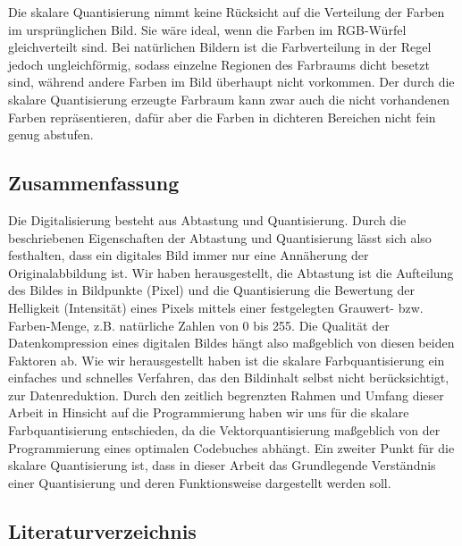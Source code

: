 Die skalare Quantisierung nimmt keine Rücksicht auf die Verteilung der Farben im ursprünglichen Bild. Sie wäre ideal, wenn die Farben im RGB-Würfel gleichverteilt sind. Bei natürlichen Bildern ist die Farbverteilung in der Regel jedoch ungleichförmig, sodass einzelne Regionen des Farbraums dicht besetzt sind, während andere Farben im Bild überhaupt nicht vorkommen. Der durch die skalare Quantisierung erzeugte Farbraum kann zwar auch die nicht vorhandenen Farben repräsentieren, dafür aber die Farben in dichteren Bereichen nicht fein genug abstufen. 
	

\subsection{\textbf{Zusammenfassung}}
Die Digitalisierung besteht aus Abtastung und Quantisierung. Durch die beschriebenen Eigenschaften der Abtastung und Quantisierung lässt sich also festhalten, dass ein digitales Bild immer nur eine Annäherung der Originalabbildung ist. Wir haben herausgestellt, die Abtastung ist die Aufteilung des Bildes in Bildpunkte (Pixel) und die Quantisierung die Bewertung der Helligkeit (Intensität) eines Pixels mittels einer festgelegten Grauwert- bzw. Farben-Menge, z.B. natürliche Zahlen von 0 bis 255. Die Qualität der Datenkompression eines digitalen Bildes hängt also maßgeblich von diesen beiden Faktoren ab. Wie wir herausgestellt haben ist die skalare Farbquantisierung ein einfaches und schnelles Verfahren, das den Bildinhalt selbst nicht berücksichtigt, zur Datenreduktion. Durch den zeitlich begrenzten Rahmen und Umfang dieser Arbeit in Hinsicht auf die Programmierung haben wir uns für die skalare Farbquantisierung entschieden, da die Vektorquantisierung maßgeblich von der Programmierung eines optimalen Codebuches abhängt. Ein zweiter Punkt für die skalare Quantisierung ist, dass in dieser Arbeit das Grundlegende Verständnis einer Quantisierung und deren Funktionsweise dargestellt werden soll.

\subsection{\textbf{Literaturverzeichnis}}

